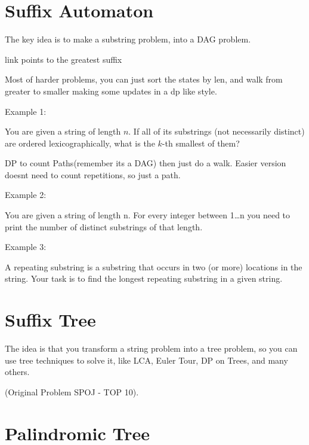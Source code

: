     \section{Suffix Automaton}
    The key idea is to make a substring problem, into a DAG problem.
    
    link points to the greatest suffix
    
    Most of harder problems,  you can just sort the states by len, and walk from greater to smaller
    making some updates in a dp like style.

    
    
    Example 1:

    You are given a string of length $n$. If all of its substrings (not necessarily distinct) are ordered lexicographically, what is the $k$-th smallest of them?

    DP to count Paths(remember its a DAG) then just do a walk. Easier version doesnt need to count repetitions, so just a path.

    
    
    Example 2:
    
    You are given a string of length n. For every integer between 1…n you need to print the number of distinct substrings of that length.

    
    
    
    Example 3:

    A repeating substring is a substring that occurs in two (or more) locations in the string. Your task is to find the longest repeating substring in a given string.
    
    
    
    \section{Suffix Tree} 
    The idea is that you transform a string problem into a tree problem, so you can use tree techniques to solve it, like LCA, Euler Tour, DP on Trees, and many others.
    
    (Original Problem SPOJ - TOP 10).
    
    \section{Palindromic Tree} 
    
